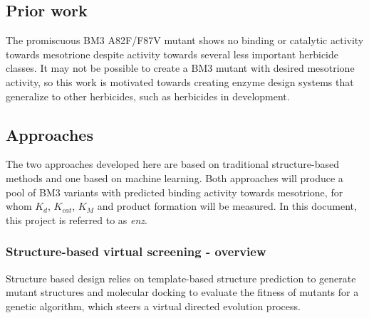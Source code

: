 \documentclass{article}
\begin{document}
\subsection{Prior work}
The promiscuous BM3 A82F/F87V mutant shows no binding or catalytic activity towards mesotrione despite activity towards several less important herbicide classes. It may not be possible to create a BM3 mutant with desired mesotrione activity, so this work is motivated towards creating enzyme design systems that generalize to other herbicides, such as herbicides in development. %
\par
\subsection{Approaches}
The two approaches developed here are based on traditional structure-based methods and one based on machine learning. %
Both approaches will produce a pool of BM3 variants with predicted binding activity towards mesotrione, for whom $K_d$, $K_{cat}$, $K_M$ and product formation will be measured. %
In this document, this project is referred to as \textit{enz}. %

\subsubsection{Structure-based virtual screening - overview}
Structure based design relies on template-based structure prediction to generate mutant structures and molecular docking to evaluate the fitness of mutants for a genetic algorithm, which steers a virtual directed evolution process. %
\par
\end{document}
